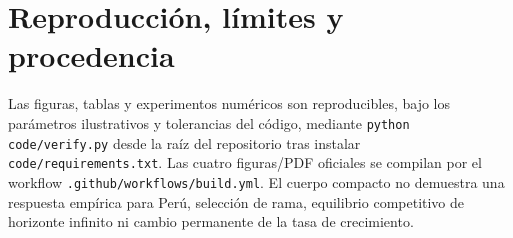 \section{Reproducción, límites y procedencia}
\label{app:compact_reproduction}
Las figuras, tablas y experimentos numéricos son
reproducibles, bajo los parámetros ilustrativos y
tolerancias del código, mediante
\texttt{python code/verify.py} desde la raíz del repositorio
tras instalar \texttt{code/requirements.txt}.
Las cuatro figuras/PDF oficiales se compilan
por el workflow \texttt{.github/workflows/build.yml}.
El cuerpo compacto no demuestra una respuesta
empírica para Perú, selección de rama, equilibrio
competitivo de horizonte infinito ni cambio
permanente de la tasa de crecimiento.
